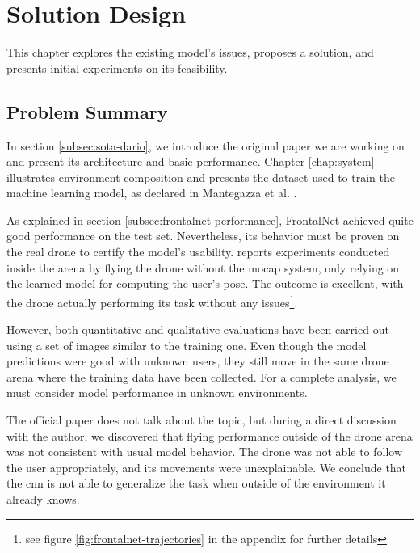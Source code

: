 \chapter{Solution Design}
\label{chap:design}


This chapter explores the existing model's issues, proposes a solution, and presents initial experiments on its feasibility.




\section{Problem Summary}
\label{sec:frontalnet-generalization}

In section \ref{subsec:sota-dario}, we introduce the original paper we are working on and present its architecture and basic performance. Chapter \ref{chap:system} illustrates environment composition and presents the dataset used to train the machine learning model, as declared in Mantegazza et al. \cite{mantegazza2019visionbased}.

\medskip

As explained in section \ref{subsec:frontalnet-performance}, FrontalNet achieved quite good performance on the test set. Nevertheless, its behavior must be proven on the real drone to certify the model's usability. \cite{mantegazza2019visionbased} reports experiments conducted inside the arena by flying the drone without the \gls{mocap} system, only relying on the learned model for computing the user's pose. The outcome is excellent, with the drone actually performing its task without any issues\footnote{see figure \ref{fig:frontalnet-trajectories} in the appendix for further details}.

However, both quantitative and qualitative evaluations have been carried out using a set of images similar to the training one. Even though the model predictions were good with unknown users, they still move in the same drone arena where the training data have been collected. For a complete analysis, we must consider model performance in unknown environments.

The official paper does not talk about the topic, but during a direct discussion with the author, we discovered that flying performance outside of the drone arena was not consistent with usual model behavior. The drone was not able to follow the user appropriately, and its movements were unexplainable. We conclude that the \gls{cnn} is not able to generalize the task when outside of the environment it already knows.

